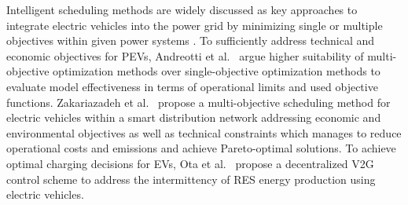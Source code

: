 %


Intelligent scheduling methods are widely discussed as key approaches to integrate electric vehicles into the power grid by minimizing single or multiple objectives within given power systems \cite{yang2015computational}.
To sufficiently address technical and economic objectives for PEVs, Andreotti et al.~\cite{andreotti2012review} argue higher suitability of multi-objective optimization methods over single-objective optimization methods to evaluate model effectiveness in terms of operational limits and used objective functions. 
Zakariazadeh et al.~\cite{zakariazadeh2014multi} propose a multi-objective scheduling method for electric vehicles within a smart distribution network addressing economic and environmental objectives as well as technical constraints which manages to reduce operational costs and emissions and achieve Pareto-optimal solutions.
To achieve optimal charging decisions for EVs, Ota et al.~\cite{ota2012autonomous} propose a decentralized V2G control scheme to address the intermittency of RES energy production using electric vehicles. 

